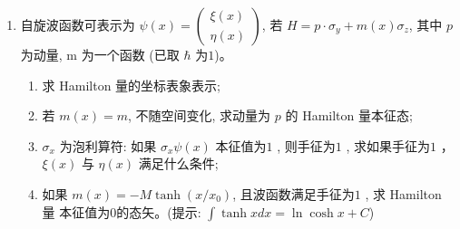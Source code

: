 \begin{enumerate}
{\begin{enumerate}
		\item 由 $x=\sqrt{\frac{\hbar}{2m\omega}}(a+a^{\dagger})$，得
		\begin{align*}
			x^2=\frac{\hbar}{2m\omega}(a^2+aa^{\dagger}+a^{\dagger}a+a^{\dagger 2})
		\end{align*}
		由于 $a|u_n\rangle=\sqrt{n}|u_{n-1}\rangle$，$a^{\dagger}|u_n\rangle=\sqrt{n+1}|u_{n+1}\rangle$，交叉项矩阵元为零，且
		\begin{align*}
			\langle u_n|aa^{\dagger}|u_n\rangle=n+1,\quad \langle u_n|a^{\dagger}a|u_n\rangle=n
		\end{align*}
		故
		\begin{align*}
			\langle u_n|x^2|u_n\rangle=\frac{\hbar}{2m\omega}(2n+1)=\frac{\hbar}{m\omega}\left(n+\frac{1}{2}\right)
		\end{align*}
	\end{enumerate}
		
	}
	
\item 
自旋波函数可表示为 $\psi(x)=\left(\begin{array}{c}\xi(x) \\ \eta(x)\end{array}\right)$, 若 $H=p \cdot \sigma_y+m(x) \sigma_z$, 其中 $p$ 为动量, $\mathrm{m}$ 为一个函数 (已取 $\hbar$ 为$  1 $)。
\begin{enumerate}
	\item
	求 Hamilton 量的坐标表象表示;
	\item 
	若 $m(x)=m$, 不随空间变化, 求动量为 $p$ 的 Hamilton 量本征态;
	\item 
	$\sigma_x$ 为泡利算符: 如果 $\sigma_x \psi(x)$ 本征值为$  1 $ , 则手征为$  1 $ , 求如果手征为$  1 $ ， $\xi(x)$ 与 $\eta(x)$ 满足什么条件;
	\item 
	如果 $m(x)=-M \tanh \left(x / x_0\right)$, 且波函数满足手征为$  1 $ , 求 Hamilton 量 本征值为$  0  $的态矢。(提示: $\int \tanh x d x=\ln \cosh x+C$)
	
	
\end{enumerate}

\end{enumerate}
